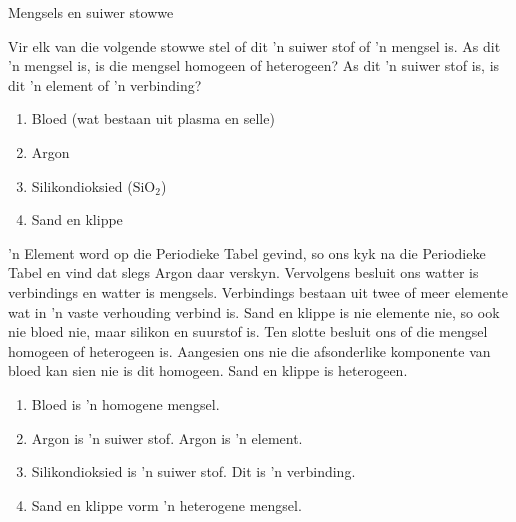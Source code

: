       \begin{wex}{Mengsels en suiwer stowwe}
{\begin{minipage}{.85\textwidth}
Vir elk van die volgende stowwe stel of dit 'n suiwer stof of 'n mengsel is. As dit 'n mengsel is, is die mengsel homogeen of heterogeen? As dit 'n suiwer stof is, is dit 'n element of 'n verbinding?
\label{m38708*eip-id1167351497334}\begin{enumerate}[noitemsep, label=\textbf{\alph*}. ] 
\item Bloed (wat bestaan uit plasma en selle)
\item Argon
\item Silikondioksied ($\text{SiO}{}_{2}$)
\item Sand en klippe
\end{enumerate}
\end{minipage}
  }
{
 'n Element word op die Periodieke Tabel gevind, so ons kyk na die Periodieke Tabel en vind dat slegs Argon daar verskyn. Vervolgens besluit ons watter is verbindings en watter is mengsels. Verbindings bestaan uit twee of meer elemente wat in 'n vaste verhouding verbind is. Sand en klippe is nie elemente nie, so ook nie bloed nie, maar silikon en suurstof is. Ten slotte besluit ons of die mengsel homogeen of heterogeen is. Aangesien ons nie die afsonderlike komponente van bloed kan sien nie is dit homogeen. Sand en klippe is heterogeen.
{}
\begin{minipage}{.85\textwidth}
\begin{enumerate}
[noitemsep, label=\textbf{\alph*}. ]
\item Bloed is 'n homogene mengsel.
\item Argon is 'n suiwer stof. Argon is 'n element.
\item Silikondioksied is 'n suiwer stof. Dit is 'n verbinding.
\item Sand en klippe vorm 'n heterogene mengsel.
\end{enumerate}
\end{minipage}}
    \end{wex}

